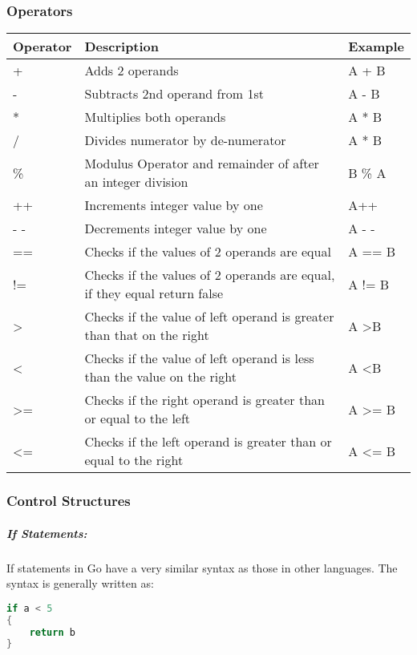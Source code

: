 \subsubsection{Operators}
\begin{center}
\begin{tabular}{ | m{3.5em} | m{14em}| m{3.5em} | }
\hline
Operator & Description & Example  \\ [0.4ex] 
\hline
+& Adds 2 operands & A + B\\ 
\hline
- & Subtracts 2nd operand from 1st	 & A - B \\ 
\hline
* & Multiplies both operands & A * B \\ 
\hline
/	 & Divides numerator by de-numerator & A * B \\ 
\hline
\% & Modulus Operator and remainder of after an integer division & B \% A  \\ 
\hline
++	 & Increments integer value by one	 & A++ \\
\hline
- -	 & Decrements integer value by one & A - - \\
\hline
==&Checks if the values of 2 operands are equal & A == B\\ 
\hline
!=& Checks if the values of 2 operands are equal, if they equal return false & A != B\\ 
\hline
\textgreater&Checks if the value of left operand is greater than that on the right & A \textgreater B\\ 
\hline
\textless& Checks if the value of left operand is less than the value on the right & A \textless B\\ 
\hline
\textgreater=& Checks if the right operand is greater than or equal to the left & A \textgreater= B\\ 
\hline
\textless=& Checks if the left operand is greater than or equal to the right  & A \textless= B\\ 

\hline
\end{tabular}
\end{center}
\subsubsection{Control Structures}
\subparagraph{If Statements:} If statements in Go have a very similar syntax as those in other languages. The syntax is generally written as:
\begin{lstlisting}[language=Go]
if a < 5 
{
    return b
}
\end{lstlisting}

